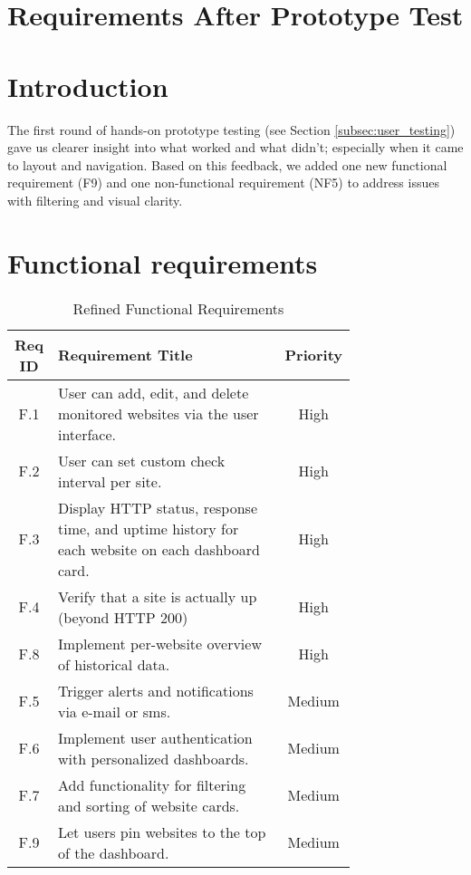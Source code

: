 \section{Requirements After Prototype Test}
\label{app:req-prototype}

\section*{Introduction}
The first round of hands-on prototype testing (see Section \ref{subsec:user_testing}) gave us clearer insight into what worked and what didn’t; especially when it came to layout and navigation. Based on this feedback, we added one new functional requirement (F9) and one non-functional requirement (NF5) to address issues with filtering and visual clarity.

\section*{Functional requirements}
\begin{table}[H]
    \centering
    \caption{Refined Functional Requirements}
    \label{tab:functional_reqs_refined}
    \begin{tabular}{|c|>{\raggedright\arraybackslash}p{0.75\linewidth}|c|}
        \hline
        \textbf{Req ID} & \textbf{Requirement Title} & \textbf{Priority} \\
        \hline
        F.1 & User can add, edit, and delete monitored websites via the user interface.& High \\ \hline 
 F.2& User can set custom check interval per site.&High\\ \hline 
 F.3 & Display HTTP status, response time, and uptime history for each website on each dashboard card.&High \\\hline
        \hline
        F.4& Verify that a site is actually up (beyond HTTP 200)& High \\ \hline 
 F.8& Implement per-website overview of historical data.&High\\\hline
        \hline
        F.5& Trigger alerts and notifications via e-mail or sms.& Medium \\
        \hline
        F.6& Implement user authentication with personalized dashboards.& Medium\\
        \hline
        F.7& Add functionality for filtering and sorting of website cards.& Medium \\\hline \hline 
 F.9& Let users pin websites to the top of the dashboard.&Medium\\\hline
    \end{tabular}
\end{table}

